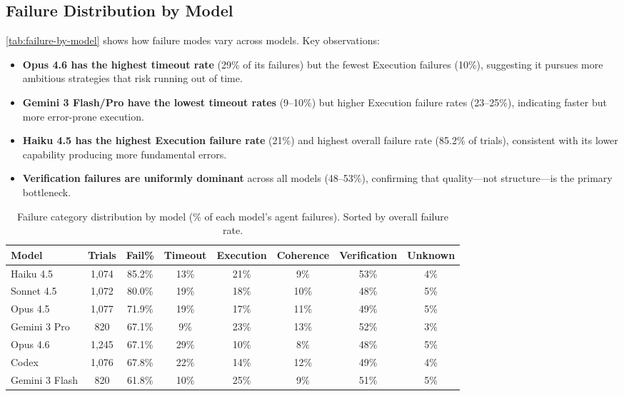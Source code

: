 \subsection{Failure Distribution by Model}
\label{app:failure-by-model}

\autoref{tab:failure-by-model} shows how failure modes vary across models. Key observations:

\begin{itemize}[nosep]
\item \textbf{Opus 4.6 has the highest timeout rate} (29\% of its failures) but the fewest Execution failures (10\%), suggesting it pursues more ambitious strategies that risk running out of time.
\item \textbf{Gemini 3 Flash/Pro have the lowest timeout rates} (9--10\%) but higher Execution failure rates (23--25\%), indicating faster but more error-prone execution.
\item \textbf{Haiku 4.5 has the highest Execution failure rate} (21\%) and highest overall failure rate (85.2\% of trials), consistent with its lower capability producing more fundamental errors.
\item \textbf{Verification failures are uniformly dominant} across all models (48--53\%), confirming that quality---not structure---is the primary bottleneck.
\end{itemize}

\begin{table}[htb]
\centering
\small
\caption{Failure category distribution by model (\% of each model's agent failures). Sorted by overall failure rate.}
\label{tab:failure-by-model}
\setlength{\tabcolsep}{3pt}
\begin{tabular}{lccccccc}
\toprule
\textbf{Model} & \textbf{Trials} & \textbf{Fail\%} & \textbf{Timeout} & \textbf{Execution} & \textbf{Coherence} & \textbf{Verification} & \textbf{Unknown} \\
\midrule
Haiku 4.5 & 1,074 & 85.2\% & 13\% & 21\% & 9\% & 53\% & 4\% \\
Sonnet 4.5 & 1,072 & 80.0\% & 19\% & 18\% & 10\% & 48\% & 5\% \\
Opus 4.5 & 1,077 & 71.9\% & 19\% & 17\% & 11\% & 49\% & 5\% \\
Gemini 3 Pro & 820 & 67.1\% & 9\% & 23\% & 13\% & 52\% & 3\% \\
Opus 4.6 & 1,245 & 67.1\% & 29\% & 10\% & 8\% & 48\% & 5\% \\
Codex & 1,076 & 67.8\% & 22\% & 14\% & 12\% & 49\% & 4\% \\
Gemini 3 Flash & 820 & 61.8\% & 10\% & 25\% & 9\% & 51\% & 5\% \\
\bottomrule
\end{tabular}
\end{table}
